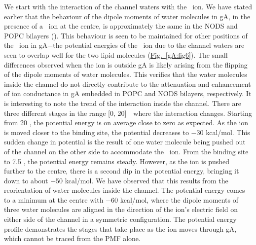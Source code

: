 We start with the interaction of the channel waters with the \K\ ion. We have stated earlier that
the behaviour of the dipole moments of water molecules in gA, in the presence of a \K\ ion at the 
centre, is approximately the same in the NODS and POPC bilayers 
(). This behaviour is seen to be maintained for other positions 
of the \K\ ion in gA$-$the potential energies of the \K\ ion due to the channel waters are seen to 
overlap well for the two lipid molecules (\hyperref[gA:fig6]{Fig.~\ref{gA:fig6}}). The small 
differences observed when the ion is outside gA is likely arising from the flipping of the dipole 
moments of water molecules. This verifies that the water molecules inside the channel do not directly 
contribute to the attenuation and enhancement of ion conductance in gA embedded in POPC and NODS 
bilayers, respectively. It is interesting to note the trend of the interaction inside the channel. 
There are three different stages in the range [0, 20]~\angs\ where the interaction changes. Starting 
from 20 \angs, the potential energy is on average close to zero as expected. As the ion is moved 
closer to the binding site, the potential decreases to $-$30 kcal/mol. This sudden change in 
potential is the result of one water molecule being pushed out of the channel on the other side to 
accommodate the \K\ ion. From the binding site to 7.5 \angs, the potential energy remains steady. 
However, as the ion is pushed further to the centre, there is a second dip in the potential energy, 
bringing it down to about $-$50 kcal/mol. We have observed that this results from the reorientation 
of water molecules inside the channel. The potential energy comes to a minimum at the centre with 
$-$60 kcal/mol, where the dipole moments of three water molecules are aligned in the direction of 
the ion's electric field on either side of the channel in a symmetric configuration. The potential 
energy profile demonstrates the stages that take place as the ion moves through gA, which cannot be 
traced from the PMF alone.

